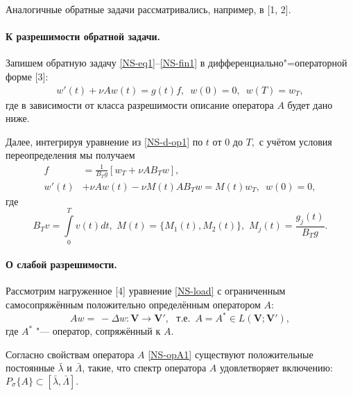 Аналогичные обратные задачи рассматривались, например, в [1, 2].

\paragraph{К разрешимости обратной задачи.}
Запишем обратную задачу \eqref{NS-eq1}--\eqref{NS-fin1} в дифференциально"=операторной форме [3]:
\begin{align} \label{NS-d-op1}
w'(t)+\nu Aw(t)=g(t)f,\,\,\, w(0)=0,\,\,\, w(T)=w_T,
\end{align}
где в зависимости от класса разрешимости описание оператора $A$ будет дано ниже.

Далее, интегрируя уравнение из \eqref{NS-d-op1} по $t$ от $0$ до $T,$ с учётом условия переопределения мы получаем
\begin{align} \label{NS-unk1}
f&=\frac{1}{B_Tg}\left[w_{T}+\nu A B_Tw\right],\\
\label{NS-load}w'(t)&+\nu A w(t)-\nu M(t)A B_Tw
=M(t)w_{T},\,\,\, w(0)=0,
\end{align}
где
\begin{equation}\label{NS-def1}
B_Tv=\int\limits_0^Tv(t)dt,\,\, M(t)=\{M_1(t), M_2(t)\},\,\, M_j\left(t\right)=\frac{g_j\left(t\right)}{B_Tg}.
\end{equation}

\paragraph{О слабой разрешимости.}
Рассмотрим нагруженное [4] уравнение \eqref{NS-load} с ограниченным самосопряжённым положительно определённым оператором $A$:
\begin{equation} \label{NS-opA1}
Aw=\ - \Delta w: \mathbf{V}\to\mathbf{V}',\,\, \textrm{ т.е. }\, A=A^*\in L(\mathbf{V};\mathbf{V}'),
\end{equation}
где $A^*$ "--- оператор, сопряжённый к $A.$

Согласно свойствам оператора $A$ \eqref{NS-opA1} существуют положительные постоянные $\bar{\lambda}$ и $\bar{\Lambda}$, такие, что спектр оператора $A$ удовлетворяет включению: $P_\sigma\{A\}\subset[\bar{\lambda},\bar{\Lambda}].$

